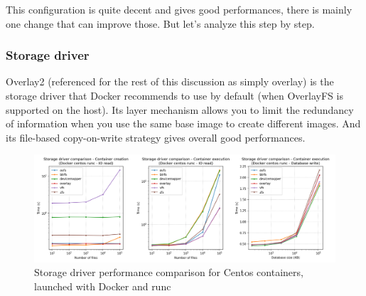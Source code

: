 This configuration is quite decent and gives good performances, there is mainly one change that can improve those.  But let's analyze this step by step.

\subsubsection{Storage driver}
Overlay2 (referenced for the rest of this discussion as simply overlay) is the storage driver that Docker recommends to use by default (when OverlayFS is supported on the host).  Its layer mechanism allows you to limit the redundancy of information when you use the same base image to create different images.  And its file-based copy-on-write strategy gives overall good performances.

\begin{figure}[h!]
  \begin{center}
    \includegraphics[width=\linewidth]{images/question-1-storage-driver.png}
    \caption{Storage driver performance comparison for Centos containers, launched with Docker and runc}
    \label{fig:q1:storage-driver}
  \end{center}
\end{figure}

